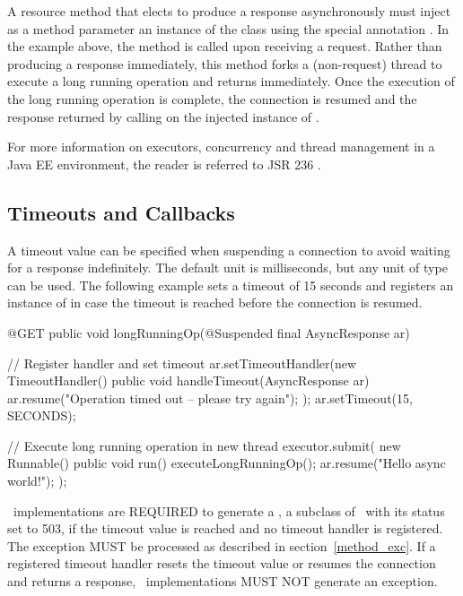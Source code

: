 A resource method that elects to produce a response asynchronously must inject as a method parameter an instance of the class  using the special annotation \Suspended. In the example above, the method  is called upon receiving a  request. Rather than producing a response immediately, this method forks a (non-request) thread to execute a long running operation and returns immediately. Once the execution of the long running operation is complete, the connection is resumed and the response returned by calling  on the injected instance of . 

For more information on executors, concurrency and thread management in a Java EE environment, the reader is referred to JSR 236 \cite{concurrencyee}.

\subsection{Timeouts and Callbacks}
\label{suspend_annotation} %

A timeout value can be specified when suspending a connection to avoid waiting for a response indefinitely. The default unit is milliseconds, but any unit of type  can be used. The following example sets a timeout of 15 seconds and registers an instance of  in case the timeout is reached before the connection is resumed.

\begin{listing}{1}
    @GET
    public void longRunningOp(@Suspended final AsyncResponse ar) {
        // Register handler and set timeout
        ar.setTimeoutHandler(new TimeoutHandler() {
            public void handleTimeout(AsyncResponse ar) {
                ar.resume("Operation timed out -- please try again");
            }
        });
        ar.setTimeout(15, SECONDS);
        
        // Execute long running operation in new thread
        executor.submit(
            new Runnable() {
                public void run() {
                    executeLongRunningOp();
                    ar.resume("Hello async world!");
        } });
    }
\end{listing}

\jaxrs\ implementations are REQUIRED to generate a , a subclass of \WebApplicationException\ with its status set to 503, if the timeout value is reached and no timeout handler is registered. The exception MUST be processed as described in section~\ref{method_exc}. If a registered timeout handler resets the timeout value or resumes the connection and returns a response, \jaxrs\ implementations MUST NOT generate an exception.

